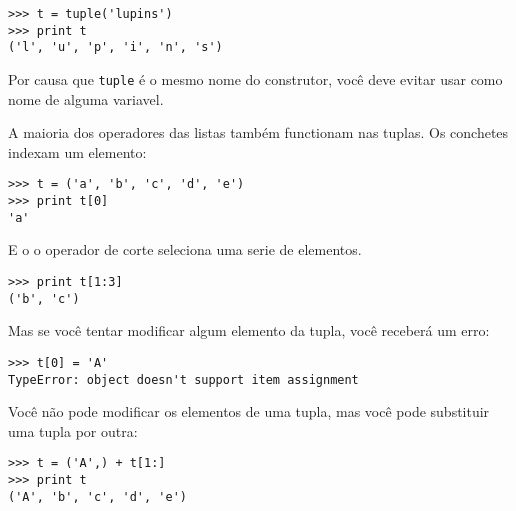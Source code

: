 \beforeverb
\begin{verbatim}
>>> t = tuple('lupins')
>>> print t
('l', 'u', 'p', 'i', 'n', 's')
\end{verbatim}
\afterverb
%
Por causa que {\tt tuple} é o mesmo nome do construtor, você deve
evitar usar como nome de alguma variavel.

A maioria dos operadores das listas também functionam nas tuplas.
Os conchetes indexam um elemento:


\beforeverb
\begin{verbatim}
>>> t = ('a', 'b', 'c', 'd', 'e')
>>> print t[0]
'a'
\end{verbatim}
\afterverb
%
E o o operador de corte seleciona uma serie de elementos.


\beforeverb
\begin{verbatim}
>>> print t[1:3]
('b', 'c')
\end{verbatim}
\afterverb
%
Mas se você tentar modificar algum elemento da tupla, você receberá
um erro:


\beforeverb
\begin{verbatim}
>>> t[0] = 'A'
TypeError: object doesn't support item assignment
\end{verbatim}
\afterverb
%
Você não pode modificar os elementos de uma tupla, mas você pode
substituir uma tupla por outra:

\beforeverb
\begin{verbatim}
>>> t = ('A',) + t[1:]
>>> print t
('A', 'b', 'c', 'd', 'e')
\end{verbatim}
\afterverb
%

